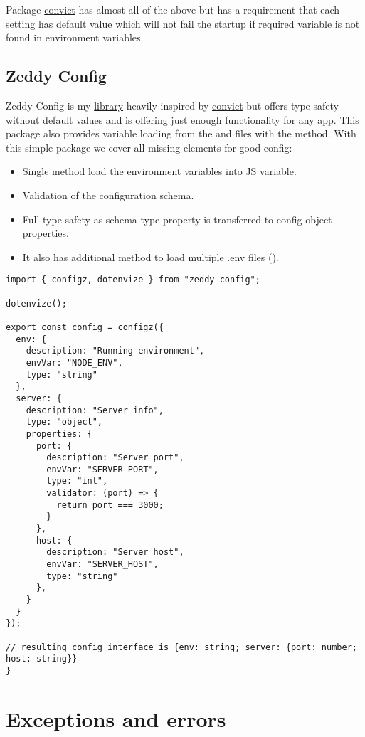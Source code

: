     Package \href{https://www.npmjs.com/package/convict}{convict} has almost all of the above but has a requirement
    that each setting has default value which will not fail the startup if required variable is not found in
    environment variables.

    \subsection{Zeddy Config}\label{subsec:zeddy-config}
    Zeddy Config is my \href{https://www.npmjs.com/package/zeddy-config}{library} heavily inspired by
    \href{https://www.npmjs.com/package/convict}{convict} but offers type safety without default values and is
    offering just enough functionality for any app.
    This package also provides variable loading from the  and  files with the  method.
    With this simple package we cover all missing elements for good config:
    \begin{itemize}
        \item Single method load the environment variables into JS variable.
        \item Validation of the configuration schema.
        \item Full type safety as schema type property is transferred to config object properties.
        \item It also has additional method to load multiple .env files ().
    \end{itemize}

    \begin{verbatim}
import { configz, dotenvize } from "zeddy-config";

dotenvize();

export const config = configz({
  env: {
    description: "Running environment",
    envVar: "NODE_ENV",
    type: "string"
  },
  server: {
    description: "Server info",
    type: "object",
    properties: {
      port: {
        description: "Server port",
        envVar: "SERVER_PORT",
        type: "int",
        validator: (port) => {
          return port === 3000;
        }
      },
      host: {
        description: "Server host",
        envVar: "SERVER_HOST",
        type: "string"
      },
    }
  }
});

// resulting config interface is {env: string; server: {port: number; host: string}}
}
    \end{verbatim}


    \section{Exceptions and errors}\label{sec:exceptions-and-errors}
    

